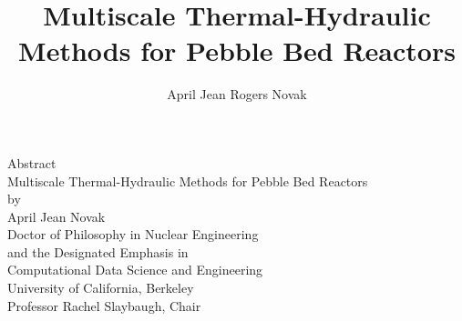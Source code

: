 \documentclass{ucbthesis}
\begin{document}
\title{Multiscale Thermal-Hydraulic Methods for Pebble Bed Reactors}
\author{April Jean Rogers Novak}


\maketitle
\approvalpage
\copyrightpage

\begin{centering}
Abstract\\
\vspace{1em}
Multiscale Thermal-Hydraulic Methods for Pebble Bed Reactors\\
\vspace{1em}
by\\
\vspace{1em}
April Jean Novak\\
\vspace{1em}
Doctor of Philosophy in Nuclear Engineering\\
\vspace{1em}
and the Designated Emphasis in\\
\vspace{1em}
Computational Data Science and Engineering\\
\vspace{1em}
University of California, Berkeley\\
\vspace{1em}
Professor Rachel Slaybaugh, Chair\\
\end{centering}
\vspace{2em}
\end{document}
